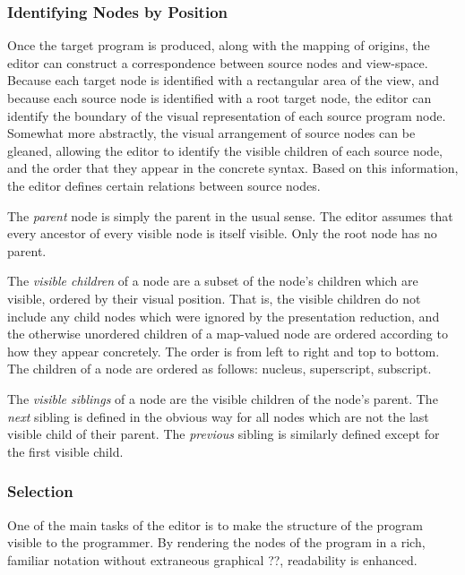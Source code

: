 \subsubsection{Identifying Nodes by Position}
Once the target program is produced, along with the mapping of origins, the editor can construct a correspondence between source nodes and view-space. Because each target node is identified with a rectangular area of the view, and because each source node is identified with a root target node, the editor can identify the boundary of the visual representation of each source program node. Somewhat more abstractly, the visual arrangement of source nodes can be gleaned, allowing the editor to identify the visible children of each source node, and the order that they appear in the concrete syntax. Based on this information, the editor defines certain relations between source nodes.

The \emph{parent} node is simply the parent in the usual sense. The editor assumes that every ancestor of every visible node is itself visible. Only the root node has no parent.

The \emph{visible children} of a node are a subset of the node's children which are visible, ordered by their visual position. That is, the visible children do not include any child nodes which were ignored by the presentation reduction, and the otherwise unordered children of a map-valued node are ordered according to how they appear concretely. The order is from left to right and top to bottom. The children of a  node are ordered as follows: nucleus, superscript, subscript.

The \emph{visible siblings} of a node are the visible children of the node's parent. The \emph{next} sibling is defined in the obvious way for all nodes which are not the last visible child of their parent. The \emph{previous} sibling is similarly defined except for the first visible child.



\subsubsection{Selection}
One of the main tasks of the editor is to make the structure of the program visible to the programmer. By rendering the nodes of the program in a rich, familiar notation without extraneous graphical ??, readability is enhanced. 

